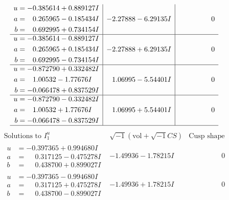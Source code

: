 \documentclass[1p]{elsarticle_modified}
\theoremstyle{definition}
\newcommand{\I}{\sqrt{-1}}
\begin{document}
$$\begin{array}{c|c|c}
\begin{aligned}
u &= -0.385614 + 0.889127 I \\
a &= \phantom{-}0.265965 - 0.185434 I \\
b &= \phantom{-}0.692995 + 0.734154 I\end{aligned}
 & -2.27888 - 6.29135 I & \phantom{-0.000000 } 0 \\ \hline\begin{aligned}
u &= -0.385614 - 0.889127 I \\
a &= \phantom{-}0.265965 + 0.185434 I \\
b &= \phantom{-}0.692995 - 0.734154 I\end{aligned}
 & -2.27888 + 6.29135 I & \phantom{-0.000000 } 0 \\ \hline\begin{aligned}
u &= -0.872790 + 0.332482 I \\
a &= \phantom{-}1.00532 - 1.77676 I \\
b &= -0.066478 + 0.837529 I\end{aligned}
 & \phantom{-}1.06995 - 5.54401 I & \phantom{-0.000000 } 0 \\ \hline\begin{aligned}
u &= -0.872790 - 0.332482 I \\
a &= \phantom{-}1.00532 + 1.77676 I \\
b &= -0.066478 - 0.837529 I\end{aligned}
 & \phantom{-}1.06995 + 5.54401 I & \phantom{-0.000000 } 0\\
 \hline 
 \end{array}$$\newpage$$\begin{array}{c|c|c}  
\text{Solutions to }I^u_{1}& \I (\text{vol} + \sqrt{-1}CS) & \text{Cusp shape}\\
 \hline 
\begin{aligned}
u &= -0.397365 + 0.994680 I \\
a &= \phantom{-}0.317125 - 0.475278 I \\
b &= \phantom{-}0.438700 + 0.899027 I\end{aligned}
 & -1.49936 - 1.78215 I & \phantom{-0.000000 } 0 \\ \hline\begin{aligned}
u &= -0.397365 - 0.994680 I \\
a &= \phantom{-}0.317125 + 0.475278 I \\
b &= \phantom{-}0.438700 - 0.899027 I\end{aligned}
 & -1.49936 + 1.78215 I & \phantom{-0.000000 } 0 \\ \hline\begin{aligned}

\end{aligned}
\end{array}$$
\end{document}
